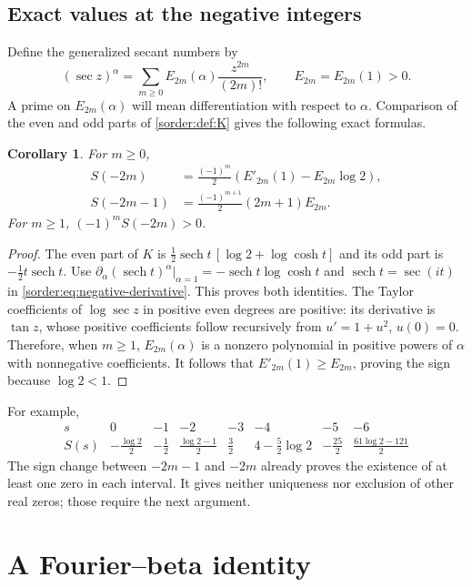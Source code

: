 \documentclass[11pt,a4paper]{article}
\newtheorem{corollary}[theorem]{Corollary}
\theoremstyle{definition}
\theoremstyle{remark}
\newcommand{\sech}{\operatorname{sech}}
\numberwithin{equation}{section}
\begin{document}
\subsection{Exact values at the negative integers}

Define the generalized secant numbers by
\[
 (\sec z)^\alpha=\sum_{m\ge0}E_{2m}(\alpha)\frac{z^{2m}}{(2m)!},
 \qquad E_{2m}=E_{2m}(1)>0.
\]
A prime on $E_{2m}(\alpha)$ will mean differentiation with respect
to $\alpha$. Comparison of the even and odd parts of \eqref{sorder:def:K}
gives the following exact formulas.
\begin{corollary}\label{sorder:cor:negative-values}
For $m\ge0$,
\begin{align}
 S(-2m)&=\frac{(-1)^m}{2}
       \left(E'_{2m}(1)-E_{2m}\log2\right),\label{sorder:eq:negative-even}\\
 S(-2m-1)&=\frac{(-1)^{m+1}}2(2m+1)E_{2m}.
 \label{sorder:eq:negative-odd}
\end{align}
For $m\ge1$, $(-1)^mS(-2m)>0$.
\end{corollary}
\begin{proof}
The even part of $K$ is
$\tfrac12\sech t\,[\log2+\log\cosh t]$ and its odd part is
$-\tfrac12t\sech t$. Use
$\partial_\alpha(\sech t)^\alpha|_{\alpha=1}
=-\sech t\log\cosh t$ and $\sech t=\sec(it)$ in
\eqref{sorder:eq:negative-derivative}. This proves both identities.
The Taylor coefficients of $\log\sec z$ in positive even degrees are
positive: its derivative is $\tan z$, whose positive coefficients
follow recursively from $u'=1+u^2$, $u(0)=0$.
Therefore, when $m\ge1$, $E_{2m}(\alpha)$ is a nonzero polynomial
in positive powers of $\alpha$ with nonnegative coefficients.
It follows that $E'_{2m}(1)\ge E_{2m}$, proving the sign because
$\log2<1$.
\end{proof}
For example,
\[
\begin{array}{c|rrrrrrr}
 s&0&-1&-2&-3&-4&-5&-6\\\hline
 S(s)&-\frac{\log2}{2}&-\frac12&\frac{\log2-1}{2}&\frac32&
 4-\frac52\log2&-\frac{25}2&\frac{61\log2-121}{2}
\end{array}
\]
The sign change between $-2m-1$ and $-2m$ already proves the existence
of at least one zero in each interval. It gives neither uniqueness nor
exclusion of other real zeros; those require the next argument.

\section{A Fourier--beta identity}
\end{document}
